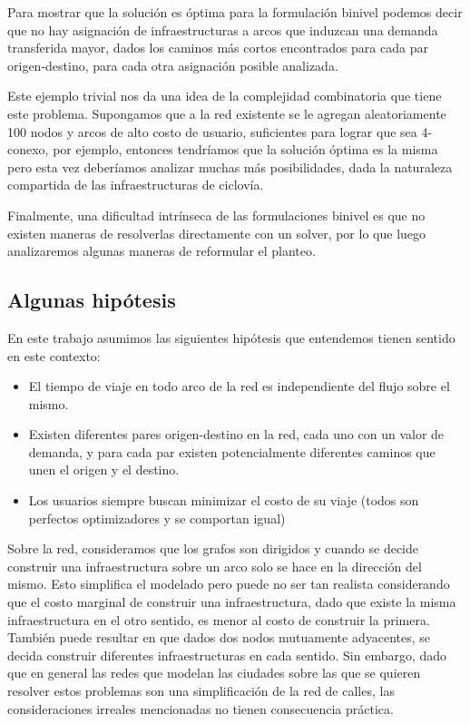 \documentclass{article}
\begin{document}
  Para mostrar que la solución es óptima para la formulación binivel podemos decir que no hay asignación de infraestructuras a arcos que induzcan una demanda transferida mayor, dados los caminos más cortos encontrados para cada par origen-destino, para cada otra asignación posible analizada.

  Este ejemplo trivial nos da una idea de la complejidad combinatoria que tiene este problema. Supongamos que a la red existente se le agregan aleatoriamente 100 nodos y arcos de alto costo de usuario, suficientes para lograr que sea 4-conexo, por ejemplo, entonces tendríamos que la solución óptima es la misma pero esta vez deberíamos analizar muchas más posibilidades, dada la naturaleza compartida de las infraestructuras de ciclovía.

  Finalmente, una dificultad intrínseca de las formulaciones binivel es que no existen maneras de resolverlas directamente con un solver, por lo que luego analizaremos algunas maneras de reformular el planteo.

  \subsection{Algunas hipótesis}

  En este trabajo asumimos las siguientes hipótesis que entendemos tienen sentido en este contexto:

  \begin{itemize}
    \item{El tiempo de viaje en todo arco de la red es independiente del flujo sobre el mismo.}
    \item{Existen diferentes pares origen-destino en la red, cada uno con un valor de demanda, y para cada par existen potencialmente diferentes caminos que unen el origen y el destino.}
    \item{Los usuarios siempre buscan minimizar el costo de su viaje (todos son
    perfectos optimizadores y se comportan igual)}
  \end{itemize}

  Sobre la red, consideramos que los grafos son dirigidos y cuando se decide construir una infraestructura sobre un arco solo se hace en la dirección del mismo. Esto simplifica el modelado pero puede no ser tan realista considerando que el costo marginal de construir una infraestructura, dado que existe la misma infraestructura en el otro sentido, es menor al costo de construir la primera. También puede resultar en que dados dos nodos mutuamente adyacentes, se decida construir diferentes infraestructuras en cada sentido. Sin embargo, dado que en general las redes que modelan las ciudades sobre las que se quieren resolver estos problemas son una simplificación de la red de calles, las consideraciones irreales mencionadas no tienen consecuencia práctica.
\end{document}

